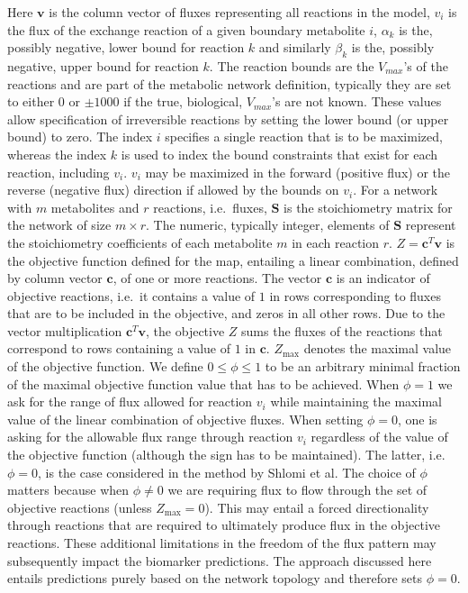 \documentclass[10pt,a4paper,onecolumn]{article}
\begin{document}
Here \(\bm{v}\) is the column vector of fluxes representing all
reactions in the model, \(v_i\) is the flux of the exchange reaction of
a given boundary metabolite \(i\), \(\alpha_k\) is the, possibly
negative, lower bound for reaction \(k\) and similarly \(\beta_k\) is
the, possibly negative, upper bound for reaction \(k\). The reaction
bounds are the \(V_{max}\)'s of the reactions and are part of the
metabolic network definition, typically they are set to either \(0\) or
\(\pm 1000\) if the true, biological, \(V_{max}\)'s are not known. These
values allow specification of irreversible reactions by setting the
lower bound (or upper bound) to zero. The index \(i\) specifies a single
reaction that is to be maximized, whereas the index \(k\) is used to
index the bound constraints that exist for each reaction, including
\(v_i\). \(v_i\) may be maximized in the forward (positive flux) or the
reverse (negative flux) direction if allowed by the bounds on \(v_i\).
For a network with \(m\) metabolites and \(r\) reactions, i.e.~fluxes,
\(\bm{S}\) is the stoichiometry matrix for the network of size
\(m \times r\). The numeric, typically integer, elements of \(\bm{S}\)
represent the stoichiometry coefficients of each metabolite \(m\) in
each reaction \(r\). \(Z = \bm{c}^T \bm{v}\) is the objective function
defined for the map, entailing a linear combination, defined by column
vector \(\bm{c}\), of one or more reactions. The vector \(\bm{c}\) is an
indicator of objective reactions, i.e.~it contains a value of \(1\) in
rows corresponding to fluxes that are to be included in the objective,
and zeros in all other rows. Due to the vector multiplication
\(\bm{c}^T \bm{v}\), the objective \(Z\) sums the fluxes of the
reactions that correspond to rows containing a value of \(1\) in
\(\bm{c}\). \(Z_{\text{max}}\) denotes the maximal value of the
objective function. We define \(0 \leq \phi \leq 1\) to be an arbitrary
minimal fraction of the maximal objective function value that has to be
achieved. When \(\phi=1\) we ask for the range of flux allowed for
reaction \(v_i\) while maintaining the maximal value of the linear
combination of objective fluxes. When setting \(\phi = 0\), one is
asking for the allowable flux range through reaction \(v_i\) regardless
of the value of the objective function (although the sign has to be
maintained). The latter, i.e. \(\phi=0\), is the case considered in the
method by Shlomi et al. The choice of \(\phi\) matters because when
\(\phi \neq 0\) we are requiring flux to flow through the set of
objective reactions (unless \(Z_{\text{max}} = 0\)). This may entail a
forced directionality through reactions that are required to ultimately
produce flux in the objective reactions. These additional limitations in
the freedom of the flux pattern may subsequently impact the biomarker
predictions. The approach discussed here entails predictions purely
based on the network topology and therefore sets \(\phi = 0\).
\end{document}

